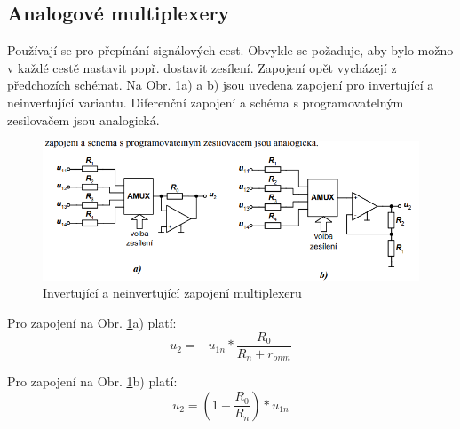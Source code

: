 \subsection{Analogové multiplexery}
Používají se pro přepínání signálových cest. Obvykle se požaduje, aby bylo možno v každé cestě nastavit popř. dostavit zesílení. Zapojení opět vycházejí z předchozích schémat. Na Obr. \ref{fig:AMUX8}a) a b) jsou uvedena zapojení pro invertující a neinvertující variantu. Diferenční zapojení a schéma s programovatelným zesilovačem jsou analogická.
\begin{figure}[h]
   \begin{center}
     \includegraphics[scale=0.5]{images/Amux8.png}
   \end{center}
   \caption{Invertující a neinvertující zapojení multiplexeru}
   \label{fig:AMUX8}
\end{figure}

Pro zapojení na Obr. \ref{fig:AMUX8}a) platí:
\begin{equation}
u_{2}=-u_{1n}*\frac{R_{0}}{R_{n}+r_{onm}}
\end{equation}

Pro zapojení na Obr. \ref{fig:AMUX8}b) platí:
\begin{equation}
u_{2}=(1+\frac{R_{0}}{R_{n}})*u_{1n}
\end{equation}



























